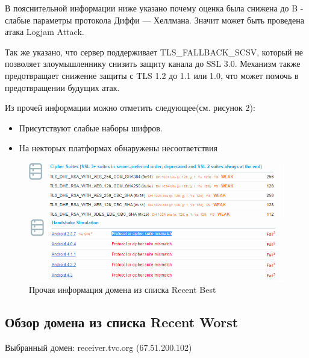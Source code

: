 \documentclass[11pt, a4paper]{article}		%
\begin{document}
В пояснительной информации ниже указано почему оценка была снижена до B - слабые параметры протокола Диффи — Хеллмана. Значит может быть проведена атака Logjam Attack.

Так же указано, что сервер поддерживает TLS\_FALLBACK\_SCSV, который не позволяет злоумышленнику снизить защиту канала до SSL 3.0. Механизм также предотвращает снижение защиты с TLS 1.2 до 1.1 или 1.0, что может помочь в предотвращении будущих атак.

Из прочей информации можно отметить следующее(см. рисунок 2):

\begin{itemize}

\item Присутствуют слабые наборы шифров.

\item На некторых платформах обнаружены несоответствия

\end{itemize}

\begin{figure}[h!]
\centering
\includegraphics[scale=0.8]{res/info_best_domain}
\caption{Прочая информация домена из списка Recent Best}
\end{figure}




\subsection{Обзор домена из списка Recent Worst}

Выбранный домен: receiver.tvc.org (67.51.200.102)
\end{document}
